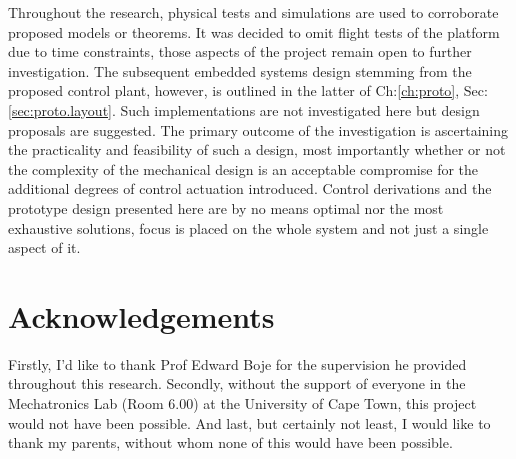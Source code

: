 \documentclass[a4paper, 11pt, oneside, openright, parskip=full]{book}
\begin{document}
\par
Throughout the research, physical tests and simulations are used to corroborate proposed models or theorems. It was decided to omit flight tests of the platform due to time constraints, those aspects of the project remain open to further investigation. The subsequent embedded systems design stemming from the proposed control plant, however, is outlined in the latter of Ch:\ref{ch:proto}, Sec:\ref{sec:proto.layout}. Such implementations are not investigated here but design proposals are suggested. The primary outcome of the investigation is ascertaining the practicality and feasibility of such a design, most importantly whether or not the complexity of the mechanical design is an acceptable compromise for the additional degrees of control actuation introduced. Control derivations and the prototype design presented here are by no means optimal nor the most exhaustive solutions, focus is placed on the whole system and not just a single aspect of it.
\par
\chapter{Acknowledgements}		
\label{ch:ack}
Firstly, I'd like to thank Prof Edward Boje for the supervision he provided throughout this research. Secondly, without the support of everyone in the Mechatronics Lab (Room 6.00) at the University of Cape Town, this project would not have been possible. And last, but certainly not least, I would like to thank my parents, without whom none of this would have been possible.
\end{document}
